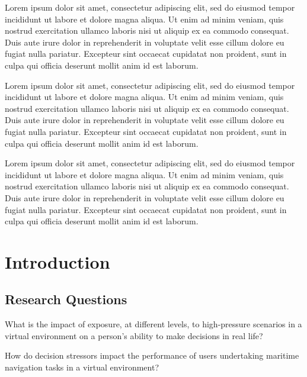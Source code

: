 \documentclass[12pt]{article}
\begin{document}
Lorem ipsum dolor sit amet, consectetur adipiscing elit, sed do eiusmod tempor incididunt ut labore et dolore magna aliqua. Ut enim ad minim veniam, quis nostrud exercitation ullamco laboris nisi ut aliquip ex ea commodo consequat. Duis aute irure dolor in reprehenderit in voluptate velit esse cillum dolore eu fugiat nulla pariatur. Excepteur sint occaecat cupidatat non proident, sunt in culpa qui officia deserunt mollit anim id est laborum.

Lorem ipsum dolor sit amet, consectetur adipiscing elit, sed do eiusmod tempor incididunt ut labore et dolore magna aliqua. Ut enim ad minim veniam, quis nostrud exercitation ullamco laboris nisi ut aliquip ex ea commodo consequat. Duis aute irure dolor in reprehenderit in voluptate velit esse cillum dolore eu fugiat nulla pariatur. Excepteur sint occaecat cupidatat non proident, sunt in culpa qui officia deserunt mollit anim id est laborum.

Lorem ipsum dolor sit amet, consectetur adipiscing elit, sed do eiusmod tempor incididunt ut labore et dolore magna aliqua. Ut enim ad minim veniam, quis nostrud exercitation ullamco laboris nisi ut aliquip ex ea commodo consequat. Duis aute irure dolor in reprehenderit in voluptate velit esse cillum dolore eu fugiat nulla pariatur. Excepteur sint occaecat cupidatat non proident, sunt in culpa qui officia deserunt mollit anim id est laborum.

\newpage

\tableofcontents

\newpage

\listoftables

\newpage

\listoffigures

\section{Introduction}

\subsection{Research Questions}

What is the impact of exposure, at different levels, to high-pressure scenarios in a virtual environment on a person's ability to make decisions in real life?

How do decision stressors impact the performance of users undertaking maritime navigation tasks in a virtual environment?
\end{document}

